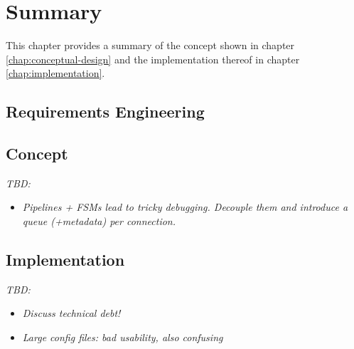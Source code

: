 \chapter{Summary}
\label{chap:summary}
This chapter provides a summary of the concept shown in chapter \ref{chap:conceptual-design} and the implementation thereof in chapter \ref{chap:implementation}.

\section{Requirements Engineering}
\label{sec:summary-requirements-engineering}

\section{Concept}
\label{sec:summary-concept}
\emph{TBD:}
\begin{itemize}
    \item \emph{Pipelines + \acp{FSM} lead to tricky debugging. Decouple them and introduce a queue (+metadata) per connection.}
\end{itemize}

\section{Implementation}
\label{sec:summary-implementation}
\emph{TBD:}
\begin{itemize}
    \item \emph{Discuss technical debt!}
    \item \emph{Large config files: bad usability, also confusing}
\end{itemize}